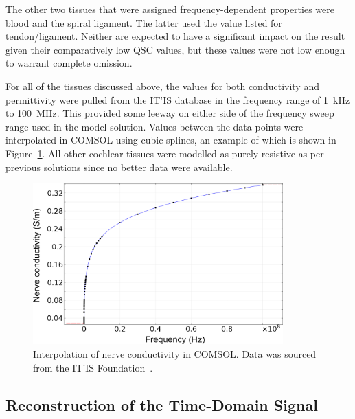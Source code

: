 The other two tissues that were assigned frequency-dependent properties were
blood and the spiral ligament. The latter used the value listed for
tendon/ligament. Neither are expected to have a significant impact on the
result given their comparatively low QSC values, but these values were not low
enough to warrant complete omission.

For all of the tissues discussed above, the values for both conductivity and
permittivity were pulled from the IT'IS database in the frequency range of
1~kHz to 100~MHz. This provided some leeway on either side of the frequency
sweep range used in the model solution. Values between the data points were
interpolated in COMSOL using cubic splines, an example of which is shown in
Figure~\ref{fig:COMSOL_nerve_cond_interp}. All other cochlear tissues were
modelled as purely resistive as per previous solutions since no better data were
available.

\begin{figure}
	\centering
	\includegraphics[height=6.2cm]{Simulations/TimeDep/nerve_cond_interp}
	\caption[Interpolation of nerve conductivity in COMSOL]{Interpolation of nerve
	conductivity in COMSOL. Data was sourced from the IT'IS
	Foundation~\cite{hasgall2015}.}
	\label{fig:COMSOL_nerve_cond_interp}
\end{figure}

\subsection{Reconstruction of the Time-Domain Signal}

